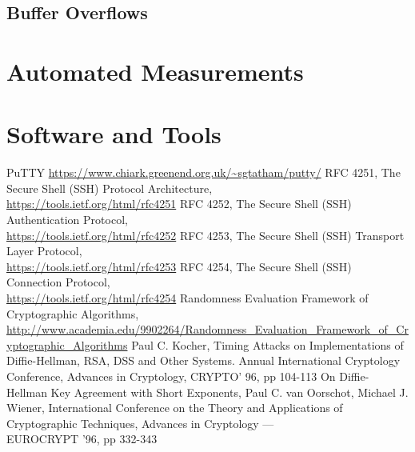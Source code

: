 \documentclass{report}
\begin{document}
\section{Buffer Overflows}
\begin{appendices}
\chapter{Automated Measurements}
\chapter{Software and Tools}
\end{appendices}
\begin{thebibliography}{9}
PuTTY
\url{https://www.chiark.greenend.org.uk/~sgtatham/putty/}
RFC 4251, The Secure Shell (SSH) Protocol Architecture,\\
\url{https://tools.ietf.org/html/rfc4251}
RFC 4252, The Secure Shell (SSH) Authentication Protocol,\\  \url{https://tools.ietf.org/html/rfc4252}
RFC 4253, The Secure Shell (SSH) Transport Layer Protocol,\\ \url{https://tools.ietf.org/html/rfc4253}
RFC 4254, The Secure Shell (SSH) Connection Protocol,\\ \url{https://tools.ietf.org/html/rfc4254}
Randomness Evaluation Framework of Cryptographic Algorithms,\\
\url{http://www.academia.edu/9902264/Randomness_Evaluation_Framework_of_Cryptographic_Algorithms}
Paul C. Kocher, Timing Attacks on Implementations of Diffie-Hellman, RSA, DSS  and Other Systems. Annual International Cryptology Conference, Advances in Cryptology, CRYPTO' 96, pp 104-113
On Diffie-Hellman Key Agreement with Short Exponents, Paul C. van Oorschot, Michael J. Wiener, International Conference on the Theory and Applications of Cryptographic Techniques, Advances in Cryptology — \\EUROCRYPT '96, pp 332-343
\end{thebibliography}
\listoffigures
\end{document}
